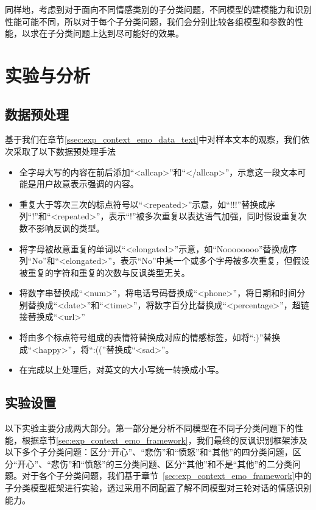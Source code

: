 同样地，考虑到对于面向不同情感类别的子分类问题，不同模型的建模能力和识别性能可能不同，所以对于每个子分类问题，我们会分别比较各组模型和参数的性能，以求在子分类问题上达到尽可能好的效果。

\section{实验与分析}
\label{sec:exp_context_emo_exp}

\subsection{数据预处理}

基于我们在章节\ref{ssec:exp_context_emo_data_text}中对样本文本的观察，我们依次采取了以下数据预处理手法

\begin{itemize}

\item 全字母大写的内容在前后添加“<allcap>”和“</allcap>”，示意这一段文本可能是用户故意表示强调的内容。

\item 重复大于等次三次的标点符号以“<repeated>”示意，如“!!!”替换成序列“!”和“<repeated>”，表示“!”被多次重复以表达语气加强，同时假设重复次数不影响反讽的类型。

\item 将字母被故意重复的单词以“<elongated>”示意，如“Noooooooo”替换成序列“No”和“<elongated>”，表示“No”中某一个或多个字母被多次重复，但假设被重复的字符和重复的次数与反讽类型无关。

\item 将数字串替换成“<num>”，将电话号码替换成“<phone>”，将日期和时间分别替换成“<date>”和“<time>”，将数字百分比替换成“<percentage>”，超链接替换成“<url>”

\item 将由多个标点符号组成的表情符替换成对应的情感标签，如将“:)”替换成“<happy>”，将“:((”替换成“<sad>”。

\item 在完成以上处理后，对英文的大小写统一转换成小写。

\end{itemize}

\subsection{实验设置}

以下实验主要分成两大部分。第一部分是分析不同模型在不同子分类问题下的性能，根据章节\ref{sec:exp_context_emo_framework}，我们最终的反讽识别框架涉及以下多个子分类问题：区分“开心”、“悲伤”和“愤怒”和“其他”的四分类问题，区分“开心”、“悲伤”和“愤怒”的三分类问题、区分“其他”和不是“其他”的二分类问题。对于各个子分类问题，我们基于章节~\ref{sec:exp_context_emo_framework}中的子分类模型框架进行实验，透过采用不同配置了解不同模型对三轮对话的情感识别能力。

